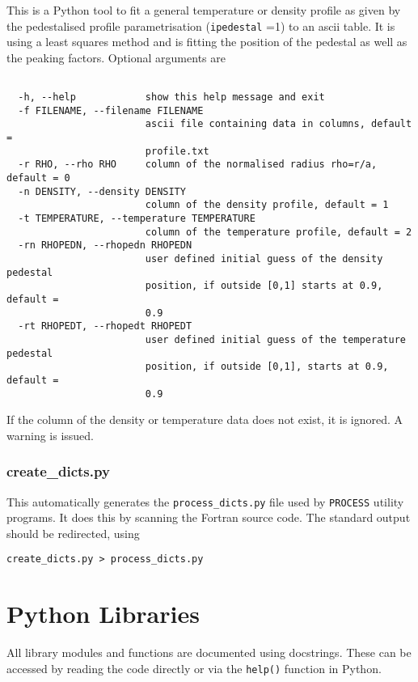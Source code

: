 \documentclass[11pt,a4paper]{article}
\newcommand{\process}{\mbox{\texttt{PROCESS}}}
\begin{document}
This is a Python tool to fit a general temperature or density profile as given
by the pedestalised profile parametrisation (\texttt{ipedestal} =1) to an
ascii table. It is using a least squares method and is fitting the position of
the pedestal as well as the peaking factors.  Optional arguments are
\begin{verbatim}

  -h, --help            show this help message and exit
  -f FILENAME, --filename FILENAME
                        ascii file containing data in columns, default =
                        profile.txt
  -r RHO, --rho RHO     column of the normalised radius rho=r/a, default = 0
  -n DENSITY, --density DENSITY
                        column of the density profile, default = 1
  -t TEMPERATURE, --temperature TEMPERATURE
                        column of the temperature profile, default = 2
  -rn RHOPEDN, --rhopedn RHOPEDN
                        user defined initial guess of the density pedestal
                        position, if outside [0,1] starts at 0.9, default =
                        0.9
  -rt RHOPEDT, --rhopedt RHOPEDT
                        user defined initial guess of the temperature pedestal
                        position, if outside [0,1], starts at 0.9, default =
                        0.9

\end{verbatim}
If the column of the density or temperature data does not exist, it is
ignored. A warning is issued.

\subsubsection{create\_dicts.py}

This automatically generates the \texttt{process\_dicts.py} file used by \process\/ utility programs.  It does this by scanning the Fortran source code.  The standard output should be redirected, using\\
\begin{verbatim}
create_dicts.py > process_dicts.py
\end{verbatim}



\section{Python Libraries}
\label{sec:py_lib}

All library modules and functions are documented using docstrings. These can
be accessed by reading the code directly or via the \texttt{help()} function
in Python.
\end{document}

